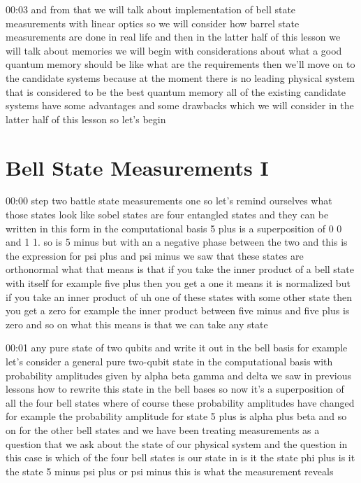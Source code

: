 00:03
and from that we will talk about implementation of bell state
measurements with linear optics so we will consider how barrel state
measurements are done in real life and then in the latter half of this lesson
we will talk about memories we will begin with considerations about
what a good quantum memory should be like what are the requirements
then we'll move on to the candidate systems because at the moment there is no
leading physical system that is considered to be
the best quantum memory all of the existing candidate systems have some
advantages and some drawbacks which we will consider in the latter half of this
lesson so let's begin

\section{Bell State Measurements I}


00:00
step two battle state measurements one so let's remind ourselves what those
states look like sobel states are four entangled states
and they can be written in this form in the computational basis
5 plus is a superposition of 0 0 and 1 1. so is 5 minus but
with an a negative phase between the two and this is the expression for psi plus
and psi minus we saw that these states are orthonormal what that means
is that if you take the inner product of a
bell state with itself for example five plus then
you get a one it means it is normalized but if you take an inner product of
uh one of these states with some other state then you get a zero for example
the inner product between five minus and five plus is zero and so on
what this means is that we can take any state

00:01
any pure state of two qubits and write it out in the bell
basis for example let's consider a general pure two-qubit state in the
computational basis with probability amplitudes given by alpha beta
gamma and delta we saw in previous lessons how to rewrite this state
in the bell bases so now it's a superposition of
all the four bell states where of course these probability amplitudes have
changed for example the probability amplitude for
state 5 plus is alpha plus beta and so on for the other bell states
and we have been treating measurements as a question that we ask about the state
of our physical system and the question in this case
is which of the four bell states is our state in
is it the state phi plus is it the state 5 minus
psi plus or psi minus this is what the measurement reveals

